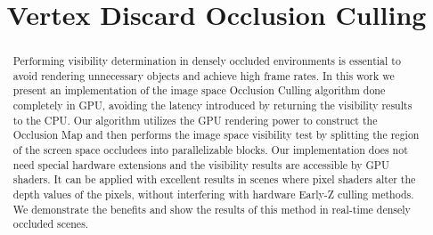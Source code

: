 \documentclass[10pt, conference]{IEEEtran}
\begin{document}
%
\title{Vertex Discard Occlusion Culling}

\newif\iffinal
\finaltrue
\newcommand{\jemsid}{99999}



\iffinal
  \author{%
  
  }
\else
  \author{Sibgrapi paper ID: \jemsid \\ }
\fi







\maketitle


\begin{abstract}
Performing visibility determination in densely occluded environments is essential to avoid rendering unnecessary objects and achieve high frame rates. 
In this work we present an implementation of the image space Occlusion Culling algorithm done completely in GPU, avoiding the latency introduced by returning 
the visibility results to the CPU. 
Our algorithm utilizes the GPU rendering power to construct the Occlusion Map and then performs the image space visibility test by splitting the region of 
the screen space occludees into parallelizable blocks. 
Our implementation does not need special hardware extensions and the visibility results are accessible by GPU shaders. It can be applied with excellent 
results in scenes where pixel shaders alter the depth values of the pixels, without interfering with hardware Early-Z culling methods. 
We demonstrate the benefits and show the results of this method in real-time densely occluded scenes.
\end{abstract}
\end{document}
